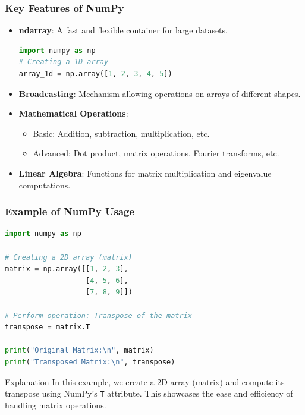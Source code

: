 \documentclass{beamer}
\begin{document}
\begin{frame}[fragile]
    \frametitle{Key Features of NumPy}
    \begin{itemize}
        \item \textbf{ndarray}: A fast and flexible container for large datasets.
        \begin{lstlisting}[language=Python]
import numpy as np
# Creating a 1D array
array_1d = np.array([1, 2, 3, 4, 5])
        \end{lstlisting}

        \item \textbf{Broadcasting}: Mechanism allowing operations on arrays of different shapes.

        \item \textbf{Mathematical Operations}:
        \begin{itemize}
            \item Basic: Addition, subtraction, multiplication, etc.
            \item Advanced: Dot product, matrix operations, Fourier transforms, etc.
        \end{itemize}

        \item \textbf{Linear Algebra}: Functions for matrix multiplication and eigenvalue computations.
    \end{itemize}
\end{frame}

\begin{frame}[fragile]
    \frametitle{Example of NumPy Usage}
    \begin{lstlisting}[language=Python]
import numpy as np

# Creating a 2D array (matrix)
matrix = np.array([[1, 2, 3], 
                   [4, 5, 6], 
                   [7, 8, 9]])

# Perform operation: Transpose of the matrix
transpose = matrix.T

print("Original Matrix:\n", matrix)
print("Transposed Matrix:\n", transpose)
    \end{lstlisting}
    \begin{block}{Explanation}
        In this example, we create a 2D array (matrix) and compute its transpose using NumPy's \texttt{T} attribute. 
        This showcases the ease and efficiency of handling matrix operations.
    \end{block}
\end{frame}
\end{document}

